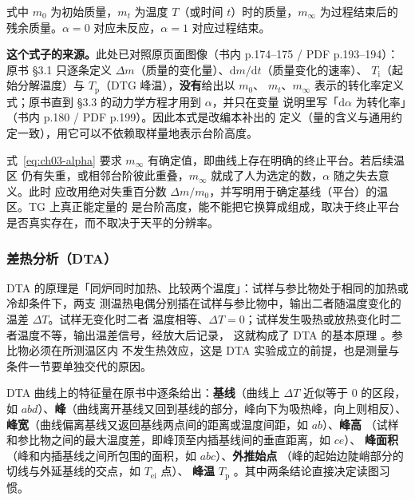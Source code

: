 式中 $m_0$ 为初始质量，$m_t$ 为温度 $T$（或时间 $t$）时的质量，$m_\infty$ 为过程结束后的
残余质量。$\alpha=0$ 对应未反应，$\alpha=1$ 对应过程结束。

\textbf{这个式子的来源。}此处已对照原页面图像（书内 p.174--175 / PDF p.193--194）：原书 §3.1
只逐条定义 $\Delta m$（质量的变化量）、$\mathrm{d}m/\mathrm{d}t$（质量变化的速率）、
$T_{\mathrm{i}}$（起始分解温度）与 $T_{\mathrm{p}}$（DTG 峰温），\textbf{没有}给出以 $m_0$、
$m_t$、$m_\infty$ 表示的转化率定义式；原书直到 §3.3 的动力学方程才用到 $\alpha$，并只在变量
说明里写「$\mathrm{d}\alpha$ 为转化率」（书内 p.180 / PDF p.199）。因此本式是改编本补出的
定义（量的含义与通用约定一致），用它可以不依赖取样量地表示台阶高度。

\begin{keycond}
式~\eqref{eq:ch03-alpha} 要求 $m_\infty$ 有确定值，即曲线上存在明确的终止平台。若后续温区
仍有失重，或相邻台阶彼此重叠，$m_\infty$ 就成了人为选定的数，$\alpha$ 随之失去意义。此时
应改用绝对失重百分数 $\Delta m/m_0$，并写明用于确定基线（平台）的温区。TG 上真正能定量的
是台阶高度，能不能把它换算成组成，取决于终止平台是否真实存在，而不取决于天平的分辨率。
\end{keycond}

\subsubsection{差热分析（DTA）}

DTA 的原理是「同炉同时加热、比较两个温度」：试样与参比物处于相同的加热或冷却条件下，两支
测温热电偶分别插在试样与参比物中，输出二者随温度变化的温差 $\Delta T$。试样无变化时二者
温度相等、$\Delta T=0$；试样发生吸热或放热变化时二者温度不等，输出温差信号，经放大后记录，
这就构成了 DTA 的基本原理 。参比物必须在所测温区内
不发生热效应，这是 DTA 实验成立的前提，也是测量与条件一节要单独交代的原因。

DTA 曲线上的特征量在原书中逐条给出：\textbf{基线}（曲线上 $\Delta T$ 近似等于 $0$ 的区段，
如 $abd$）、\textbf{峰}（曲线离开基线又回到基线的部分，峰向下为吸热峰，向上则相反）、
\textbf{峰宽}（曲线偏离基线又返回基线两点间的距离或温度间距，如 $ab$）、\textbf{峰高}
（试样和参比物之间的最大温度差，即峰顶至内插基线间的垂直距离，如 $ce$）、
\textbf{峰面积}（峰和内插基线之间所包围的面积，如 $abc$）、\textbf{外推始点}
（峰的起始边陡峭部分的切线与外延基线的交点，如 $T_{\mathrm{ei}}$ 点）、
\textbf{峰温} $T_{\mathrm p}$
。其中两条结论直接决定读图习惯。

